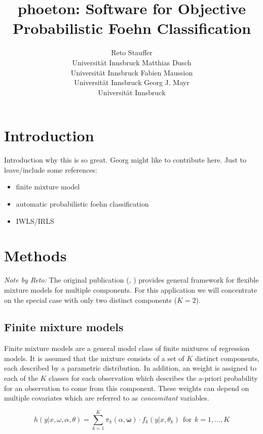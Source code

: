 \documentclass[article,nojss,shortnames]{jss}
\author{Reto Stauffer\\Universit\"at Innsbruck
\And Matthias Dusch\\Universit\"at Innsbruck
\AND Fabien Maussion\\Universit\"at Innsbruck
\And Georg J. Mayr\\Universit\"at Innsbruck}
\title{phoeton: Software for Objective Probabilistic Foehn Classification}
\begin{document}
\section{Introduction}

Introduction why this is so great. Georg might like to contribute
here. Just to leave/include some references:

\begin{itemize}
    \item finite mixture model \citep{leisch2004,gruen2008}
    \item automatic probabilistic foehn classification \cite{plavcan2014}
    \item IWLS/IRLS \citep{mccullagh1989}
\end{itemize}



\section{Methods}

\textit{Note by Reto:}
The original publication (, \citealt{gruen2008})
provides general framework for flexible mixture models for multiple
components. For this application we will concentrate on the special
case with only two distinct components ($K = 2$).

\subsection{Finite mixture models}

Finite mixture models are a general model class of finite
mixtures of regression models. It is assumed that the mixture
consists of a set of $K$ distinct components, each described by
a parametric distribution.
In addition, an weight is assigned to each of the $K$ classes
for each observation which describes the a-priori probability
for an observation to come from this component.
These weights can depend on multiple covariates which are
referred to as \textit{concomitant} variables.

\begin{equation}
    h(\mathit{y} | \mathit{x}, \mathit{\omega}, \mathit{\alpha}, \mathit{\theta}) =
        \sum_{k=1}^K \pi_k(\mathit{\alpha}, \mathbf{\omega}) \cdot f_k(\mathit{y} | \mathit{x}, \mathit{\theta}_k)
        ~~\text{for}~~k=1,\dots,K
    \label{eqn:flexmix-density-general}
\end{equation}
\end{document}
